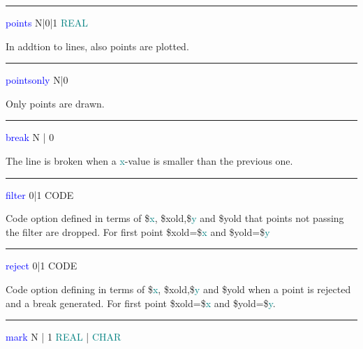 \vspace{0.3cm} 
\hrule 
\vspace{0.3cm} 
\noindent \textcolor{blue}{points}  \tabto{3cm} N|0|1 \tabto{5cm}  \textcolor{teal}{REAL} \tabto{7cm} 
\begin{changemargin}{3cm}{0cm} 
\noindent In addtion to lines, also points are plotted. 
\end{changemargin} 
\vspace{0.3cm} 
\hrule 
\vspace{0.3cm} 
\noindent \textcolor{blue}{pointsonly} \tabto{3cm} N|0 \tabto{5cm}   \tabto{7cm} 
\begin{changemargin}{3cm}{0cm} 
\noindent Only points are drawn. 
\end{changemargin} 
\vspace{0.3cm} 
\hrule 
\vspace{0.3cm} 
\noindent \textcolor{blue}{break}  \tabto{3cm}  N | 0  \tabto{5cm}    \tabto{7cm} 
\begin{changemargin}{3cm}{0cm} 
\noindent  The line is broken when a \textcolor{teal}{x}-value is smaller than the previous one. 
\end{changemargin} 
\vspace{0.3cm} 
\hrule 
\vspace{0.3cm} 
\noindent \textcolor{blue}{filter}  \tabto{3cm} 0|1  \tabto{5cm}  CODE  \tabto{7cm} 
\begin{changemargin}{3cm}{0cm} 
\noindent  Code option defined in terms of \$\textcolor{teal}{x}, \$xold,\$\textcolor{teal}{y} and \$yold that 
points not passing the filter are dropped. For first point \$xold=\$\textcolor{teal}{x} and \$yold=\$\textcolor{teal}{y} 
\end{changemargin} 
\vspace{0.3cm} 
\hrule 
\vspace{0.3cm} 
\noindent \textcolor{blue}{reject}  \tabto{3cm} 0|1  \tabto{5cm}  CODE  \tabto{7cm} 
\begin{changemargin}{3cm}{0cm} 
\noindent  Code option defining in terms of \$\textcolor{teal}{x}, \$xold,\$\textcolor{teal}{y} and \$yold when 
a point is rejected and a break generated. For first point \$xold=\$\textcolor{teal}{x} and \$yold=\$\textcolor{teal}{y}. 
\end{changemargin} 
\vspace{0.3cm} 
\hrule 
\vspace{0.3cm} 
\noindent \textcolor{blue}{mark}  \tabto{3cm}  N | 1  \tabto{5cm}   \textcolor{teal}{REAL} | \textcolor{teal}{CHAR}  \tabto{7cm} 
